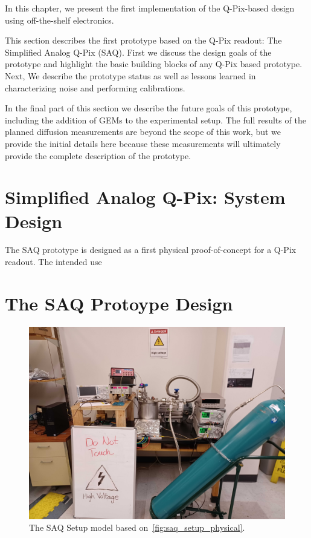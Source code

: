 In this chapter, we present the first implementation of the Q-Pix-based design using off-the-shelf electronics.

This section describes the first prototype based on the Q-Pix readout: The Simplified Analog Q-Pix (SAQ).
First we discuss the design goals of the prototype and highlight the basic building blocks of any Q-Pix based prototype.
Next, We describe the prototype status as well as lessons learned in characterizing noise and performing calibrations.

In the final part of this section we describe the future goals of this prototype, including the addition of GEMs to the experimental setup.
The full results of the planned diffusion measurements are beyond the scope of this work, but we provide the initial details here because these measurements will ultimately provide the complete description of the prototype.

\section{Simplified Analog Q-Pix: System Design}

The SAQ prototype is designed as a first physical proof-of-concept for a Q-Pix readout.
The intended use

\section{The SAQ Protoype Design}




\begin{figure}[]
\centering
\includegraphics[width=\textwidth]{images/SAQ_setup.jpeg}
\caption{The SAQ Setup model based on~\ref{fig:saq_setup_physical}.}
\end{figure}~\label{fig:saq_setup_flatten}


